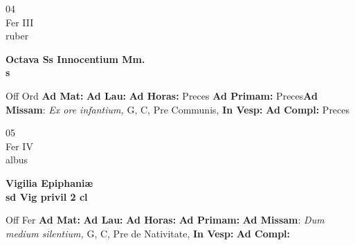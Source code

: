 \documentclass[10pt, openany]{book}
\begin{document}
        \begin{center}
            \begin{minipage}{3.5in}
                \vspace{2em}
                \begin{minipage}{0.5in}
                    {\Huge 04} \\
                    {\normalsize Fer III} \\
                    {\normalsize ruber}
                \end{minipage}
                \begin{minipage}{3.0in}
                    \textbf{ \large Octava Ss Innocentium Mm. \\
                    \textnormal{\normalsize s}} \\ 
                \end{minipage}
                \begin{justify}Off Ord
                    \textbf{Ad Mat: }
                    \textbf{Ad Lau: }
                    \textbf{Ad Horas: }Preces
                    \textbf{Ad Primam: }Preces\textbf{Ad Missam}: \textit{Ex ore infantium,} G, C, Pre Communis,  
                    \textbf{In Vesp: }
                    \textbf{Ad Compl: }Preces
                \end{justify}
            \end{minipage}
        \end{center}
    
        \begin{center}
            \begin{minipage}{3.5in}
                \vspace{2em}
                \begin{minipage}{0.5in}
                    {\Huge 05} \\
                    {\normalsize Fer IV} \\
                    {\normalsize albus}
                \end{minipage}
                \begin{minipage}{3.0in}
                    \textbf{ \large Vigilia Epiphaniæ \\
                    \textnormal{\normalsize sd Vig privil 2 cl}} \\ 
                \end{minipage}
                \begin{justify}Off Fer
                    \textbf{Ad Mat: }
                    \textbf{Ad Lau: }
                    \textbf{Ad Horas: }
                    \textbf{Ad Primam: }\textbf{Ad Missam}: \textit{Dum medium silentium,} G, C, Pre de Nativitate,  
                    \textbf{In Vesp: }
                    \textbf{Ad Compl: }
                \end{justify}
            \end{minipage}
        \end{center}
    
\end{document}
